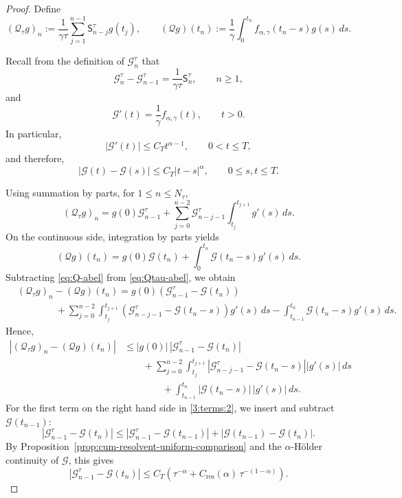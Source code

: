 \documentclass[letterpaper]{article}
\numberwithin{equation}{section}
\theoremstyle{definition}
\theoremstyle{remark}
\begin{document}
\begin{proof}
Define
\[
  (\mathcal Q_\tau g)_n
  :=
  \frac{1}{\gamma\tau}\sum_{j=1}^{n-1}\mathsf{S}_{n-j}^\tau g(t_j),
  \qquad
  (\mathcal Q g)(t_n)
  :=
  \frac1\gamma\int_0^{t_n}f_{\alpha,\gamma}(t_n-s)g(s)\,ds.
\]

Recall from the definition of $\mathcal G_n^\tau$ that
\[
  \mathcal G_n^\tau-\mathcal G_{n-1}^\tau
  =
  \frac{1}{\gamma\tau}\mathsf{S}_n^\tau,
  \qquad n\ge1,
\]
and
\[
  \mathcal G'(t)=\frac1\gamma f_{\alpha,\gamma}(t),\qquad t>0.
\]
In particular,
\[
  |\mathcal G'(t)|\le C_T t^{\alpha-1},
  \qquad 0<t\le T,
\]
and therefore,
\[
  |\mathcal G(t)-\mathcal G(s)|\le C_T|t-s|^\alpha,
  \qquad 0\le s,t\le T.
\]

Using summation by parts, for $1\le n\le N_\tau$,
\begin{equation}\label{eq:Qtau-abel}
  (\mathcal Q_\tau g)_n
  =
  g(0)\mathcal G_{n-1}^\tau
  +\sum_{j=0}^{n-2}\mathcal G_{n-j-1}^\tau
   \int_{t_j}^{t_{j+1}} g'(s)\,ds.
\end{equation}
On the continuous side, integration by parts yields
\begin{equation}\label{eq:Q-abel}
  (\mathcal Q g)(t_n)
  =
  g(0)\mathcal G(t_n)
  +\int_0^{t_n}\mathcal G(t_n-s)g'(s)\,ds.
\end{equation}
Subtracting \eqref{eq:Q-abel} from \eqref{eq:Qtau-abel}, we obtain
\begin{align*}
  &(\mathcal Q_\tau g)_n-(\mathcal Q g)(t_n)
    =
  g(0)\left(\mathcal G_{n-1}^\tau-\mathcal G(t_n)\right)
  \\
  &
  \qquad\qquad+
  \sum_{j=0}^{n-2}
  \int_{t_j}^{t_{j+1}}
  \left(\mathcal G_{n-j-1}^\tau-\mathcal G(t_n-s)\right)g'(s)\,ds
  -
  \int_{t_{n-1}}^{t_n}\mathcal G(t_n-s)g'(s)\,ds.
\end{align*}
Hence,
\begin{align}
  \left|(\mathcal Q_\tau g)_n-(\mathcal Q g)(t_n)\right|
  &\le
  |g(0)|\,|\mathcal G_{n-1}^\tau-\mathcal G(t_n)|
  \nonumber
  \\
  &\qquad
  +
  \sum_{j=0}^{n-2}
  \int_{t_j}^{t_{j+1}}
  \left|\mathcal G_{n-j-1}^\tau-\mathcal G(t_n-s)\right|
  |g'(s)|\,ds
  \nonumber
  \\
  &\qquad\qquad
  +
  \int_{t_{n-1}}^{t_n}|\mathcal G(t_n-s)|\,|g'(s)|\,ds.\label{3:terms:2}
\end{align}
For the first term on the right hand side in \eqref{3:terms:2}, we insert and subtract $\mathcal G(t_{n-1})$:
\[
  |\mathcal G_{n-1}^\tau-\mathcal G(t_n)|
  \le
  |\mathcal G_{n-1}^\tau-\mathcal G(t_{n-1})|
  +
  |\mathcal G(t_{n-1})-\mathcal G(t_n)|.
\]
By Proposition~\ref{prop:cum-resolvent-uniform-comparison} and the
$\alpha$-H\"older continuity of $\mathcal G$, this gives
\[
  |\mathcal G_{n-1}^\tau-\mathcal G(t_n)|
  \le
  C_T\left(\tau^{-\alpha}+{C_{\mathrm{res}}(\alpha)}\,\tau^{-(1-\alpha)}\right).
\]


\end{proof}
\end{document}
